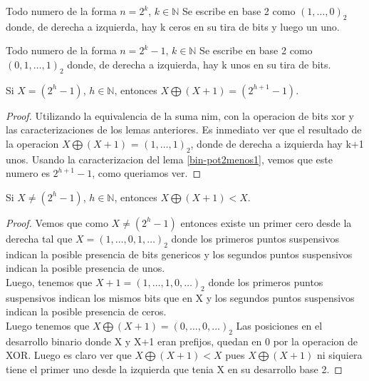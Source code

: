 \begin{lemma}
	Todo numero de la forma $n = 2^k$, $ k \in \mathbb{N}$ Se escribe en base 2 como $(1, \dots, 0)_2$ donde, de derecha a izquierda, hay k ceros en su tira de bits y luego un uno.
\end{lemma}

\begin{lemma}
	\label{bin-pot2menos1}
	Todo numero de la forma $n = 2^k - 1$, $ k \in \mathbb{N}$ Se escribe en base 2 como $(0, 1, \dots, 1)_2$ donde, de derecha a izquierda, hay k unos en su tira de bits.
\end{lemma}

\begin{theorem}
Si $X = (2^h - 1)$, $h \in \mathbb{N}$, entonces $X \bigoplus (X+1) = (2^{h+1} - 1)$.\\
\end{theorem}
\begin{proof}
	Utilizando la equivalencia de la suma nim, con la operacion de bits xor y las caracterizaciones de los lemas anteriores. Es inmediato ver que el resultado de la operacion $X \bigoplus (X+1)$ = $(1, \dots, 1)_2$, donde de derecha a izquierda hay k+1 unos. Usando la caracterizacion del lema \ref{bin-pot2menos1}, vemos que este numero es $2^{h+1}-1$, como queriamos ver.
\end{proof}

\begin{theorem}
Si $X \neq (2^h - 1)$, $h \in \mathbb{N}$, entonces $X \bigoplus (X+1) < X $.\\
\end{theorem}
\begin{proof}
Vemos que como $X \neq (2^h - 1)$ entonces existe un primer cero desde la derecha tal que $X = (1, \dots, 0, 1, \dots)_2 $ donde los primeros puntos suspensivos indican la posible presencia de bits genericos y los segundos puntos suspensivos indican la posible presencia de unos.\\
Luego, tenemos que $X + 1 = (1, \dots, 1, 0, \dots)_2 $ donde los primeros puntos suspensivos indican los mismos bits que en X y los segundos puntos suspensivos indican la posible presencia de ceros.\\
Luego tenemos que $X \bigoplus (X+1) = (0, \dots, 0, \dots)_2$ Las posiciones en el desarrollo binario donde X y X+1 eran prefijos, quedan en 0 por la operacion de XOR. Luego es claro ver que $X \bigoplus (X+1) < X$ pues $X \bigoplus (X+1)$ ni siquiera tiene el primer uno desde la izquierda que tenia X en su desarrollo base 2.
\end{proof}